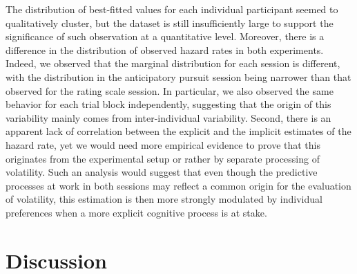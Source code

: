\documentclass[10pt,letterpaper]{article}
\begin{document}
The distribution of best-fitted values for each individual participant seemed to qualitatively cluster,
but the dataset is still insufficiently large to support the significance of such observation
at a quantitative level.
Moreover, there is a difference in the distribution of observed hazard rates in both experiments.
Indeed, we observed that the marginal distribution for each session is different,
with the distribution in the anticipatory pursuit session being narrower than
that observed for the rating scale session.
In particular, we also observed the same behavior for each trial block independently,
suggesting that the origin of this variability mainly comes from inter-individual variability.
Second, there is an apparent lack of correlation between the explicit and the implicit estimates of the hazard rate,
yet we would need more empirical evidence to prove
that this originates from the experimental setup or rather by separate processing of volatility.
Such an analysis would suggest that even though the predictive processes
at work in both sessions may reflect a common origin for the evaluation of volatility,
this estimation is then more strongly modulated by individual preferences
when a more explicit cognitive process is at stake.
\section{Discussion}
\label{sec:outro}
\end{document}
